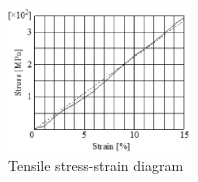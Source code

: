\documentclass{jarticle}
\begin{document}


\begin{figure}[h]
 \centering
  \includegraphics[height=38mm]{./figs/fig1.eps}
  \vspace*{-4mm}
  \caption{Tensile stress-strain diagram}
  \label{fig: fig1}
\end{figure}
\end{document}

